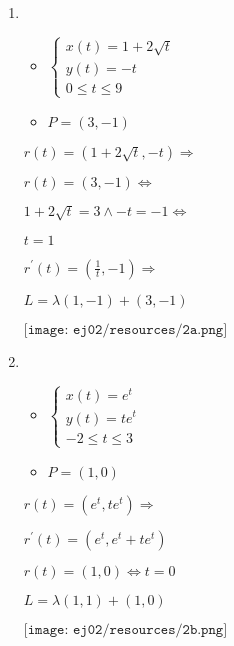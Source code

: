\documentclass[../practica_04.tex]{subfiles}
\begin{document}
    \begin{enumerate}
        \item 
            \begin{itemize}
                \item \quad $\left\{
                        \begin{array}{ll}
                            x(t) = 1+2\sqrt{t}\\
                            y(t) = -t\\
                            0 \leq t \leq 9
                        \end{array}
                    \right.$
                \item $P=(3,-1)$
            \end{itemize}

            $r(t) = (1+2\sqrt{t}, -t) \Rightarrow$

            $r(t) = (3,-1) \Leftrightarrow $

            $ 1 + 2\sqrt{t} = 3 \wedge -t = -1 \Leftrightarrow $

            $ t = 1 $

            $r^{\prime}(t)=(\frac{1}{t}, -1) \Rightarrow$

            $ L = \lambda(1,-1) + (3,-1)$

            $ \texttt{[image: ej02/resources/2a.png]}  $
            
            \item 
            \begin{itemize}
                \item \quad $\left\{
                    \begin{array}{ll}
                        x(t) = e^t\\
                        y(t) = te^t\\
                        -2 \leq t \leq 3
                    \end{array}
                    \right.$
                    \item $P=(1,0)$
                \end{itemize}

            $r(t) = (e^t,te^t) \Rightarrow$

            $r^{\prime}(t) = (e^t, e^t + te^t)$

            $r(t) = (1,0) \Leftrightarrow t = 0$

            $L =\lambda(1,1) + (1,0) $

            $ \texttt{[image: ej02/resources/2b.png]}  $

    \end{enumerate}
\end{document}
